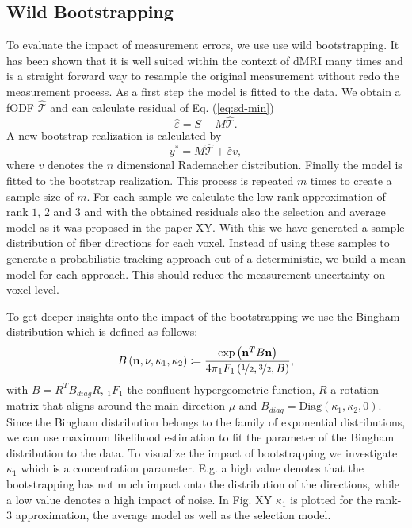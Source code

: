 \subsection{Wild Bootstrapping}
To evaluate the impact of measurement errors, we use use wild bootstrapping. It
has been shown that it is well suited within the context of dMRI many times and
is a straight forward way to
resample the original measurement without redo the measurement process.
As a first step the model is fitted to the data. We obtain a fODF
$\hat{\mathcal{T}}$ and can calculate residual of Eq. (\ref{eq:sd-min}) 
\[ \hat{\varepsilon} = S - M\hat{\mathcal{T}} .\] 
A new bootstrap realization is calculated by 
\[ y^{*} = M\hat{\mathcal{T}}  + \hat{\varepsilon} v , \]
where $v$ denotes the $n$ dimensional Rademacher distribution. Finally the
model is fitted to the bootstrap realization. This process is repeated $m$
times to create a sample size of $m$.
For each sample we calculate the low-rank approximation of rank $1$, $2$ and $3$
and with the obtained residuals also the selection and average model as it was
proposed in the paper XY. With this we have generated a sample distribution of
fiber directions for each voxel. Instead of using these samples to generate a
probabilistic tracking approach out of a deterministic, we build a mean model
for each approach. This should reduce the measurement uncertainty on voxel
level. 

To get deeper insights onto the impact of the bootstrapping we use the  Bingham 
distribution which is defined as follows: 
\[
	B \left( \mathbf{n}, \nu, \kappa_1, \kappa_2 \right) \coloneqq
	\frac{\exp \left( \mathbf{n}^T B \mathbf{n} \right)}{4 \pi {}_1F_1
	\left( \nicefrac{1}{2} , \nicefrac{3}{2} , B \right)} ,  
\]
with $B = R^T B_{diag} R$, ${}_1 F_1$ the confluent hypergeometric function, $R$
a rotation matrix that aligns around the main direction $\mu$ and $B_{diag} =
\text{Diag} \left( \kappa_1, \kappa_2 , 0 \right)$. 
Since the Bingham distribution belongs to the family of exponential
distributions, we can use maximum likelihood estimation to fit the parameter of
the Bingham distribution to the data. To visualize the impact of bootstrapping
we investigate $\kappa_1$ which is a concentration parameter. E.g. a high value
denotes that the bootstrapping has not much impact onto the distribution of the
directions, while a low value denotes a high impact of noise. In Fig. XY
$\kappa_1$ is plotted for the rank-$3$ approximation, the average model as well
as the selection model.



